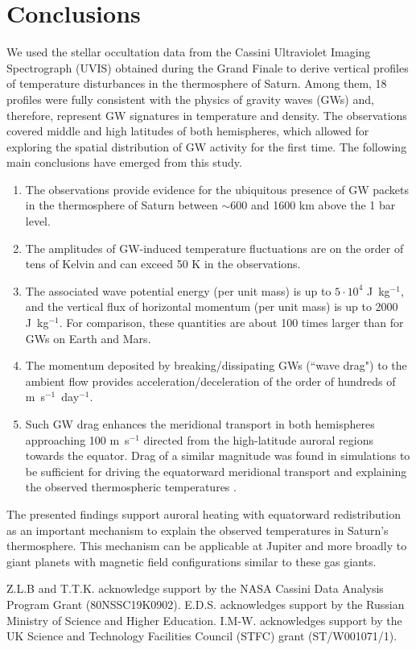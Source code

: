 \section{Conclusions}
\label{sec:concl}
We used the stellar occultation data from the Cassini Ultraviolet Imaging Spectrograph (UVIS) obtained during the Grand Finale to derive vertical profiles of temperature disturbances in the thermosphere of Saturn. Among them, 18 profiles were fully consistent with the physics of gravity waves (GWs) and, therefore, represent GW signatures in temperature and density. The observations covered middle and high latitudes of both hemispheres, which allowed for exploring the spatial distribution of GW activity for the first time. The following main conclusions have emerged from this study.
\begin{enumerate}
    \item The observations provide evidence for the ubiquitous presence of GW packets in the thermosphere of Saturn between $\sim$600 and 1600 km above the 1 bar level.
    \item The amplitudes of GW-induced temperature fluctuations are on the order of tens of Kelvin and can exceed 50 K in the observations.
    \item The associated wave potential energy (per unit mass) is up to $5\cdot 10^{4}$ J~kg$^{-1}$, and the vertical flux of horizontal momentum (per unit mass) is up to 2000 J~kg$^{-1}$. For comparison, these quantities are about 100 times larger than for GWs on Earth and Mars.
    \item The momentum deposited by breaking/dissipating GWs (``wave drag") to the ambient flow provides acceleration/deceleration of the order of hundreds of m~s$^{-1}$~day$^{-1}$.
    \item Such GW drag enhances the meridional transport in both hemispheres approaching 100 m~s$^{-1}$ directed from the high-latitude auroral regions towards the equator. Drag of a similar magnitude was found in simulations to be sufficient for driving the equatorward meridional transport and explaining the observed thermospheric temperatures \cite{MW19}.
\end{enumerate}

The presented findings support auroral heating with equatorward redistribution as an important mechanism to explain the observed temperatures in Saturn's thermosphere. This mechanism can be applicable at Jupiter and more broadly to giant planets with magnetic field configurations similar to these gas giants.



\acknowledgments
Z.L.B and T.T.K. acknowledge support by the NASA Cassini Data Analysis Program Grant (80NSSC19K0902). E.D.S. acknowledges support by the Russian Ministry of Science and Higher Education. I.M-W. acknowledges support by the UK Science and Technology Facilities Council (STFC) grant (ST/W001071/1).
